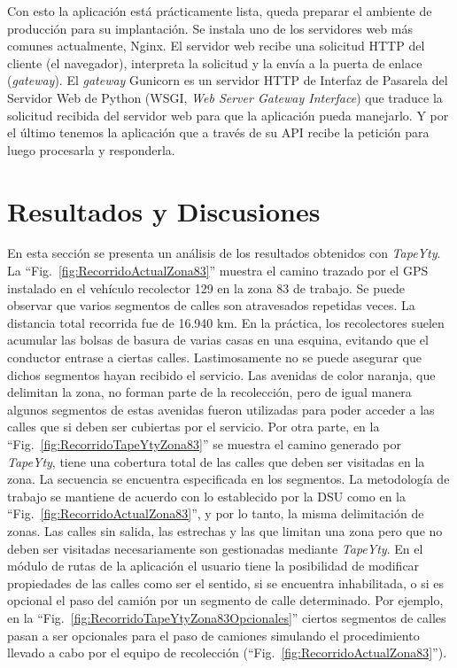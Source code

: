 \documentclass[spanish, conference]{IEEEtran}
\begin{document}
Con esto la aplicación está prácticamente lista, queda preparar el ambiente de producción para su implantación. Se instala uno de los servidores web más comunes actualmente, Nginx. El servidor web recibe una solicitud HTTP del cliente (el navegador), interpreta la solicitud y la envía a la puerta de enlace (\textit{gateway}). El \textit{gateway} Gunicorn es un servidor HTTP de Interfaz de Pasarela del Servidor Web de Python (WSGI, \textit{Web Server Gateway Interface}) que traduce la solicitud recibida del servidor web para que la aplicación pueda manejarlo. Y por el último tenemos la aplicación que a través de su API recibe la petición para luego procesarla y responderla.

\section{Resultados y Discusiones}

En esta sección se presenta un análisis de los resultados obtenidos con \textit{TapeYty}.
La ``Fig.~\ref{fig:RecorridoActualZona83}'' muestra el camino trazado por el GPS instalado en el vehículo recolector 129 en la zona 83 de trabajo. Se puede observar que varios segmentos de calles son atravesados repetidas veces. La distancia total recorrida fue de 16.940 km. En la práctica, los recolectores suelen acumular las bolsas de basura de varias casas en una esquina, evitando que el conductor entrase a ciertas calles. Lastimosamente no se puede asegurar que dichos segmentos hayan recibido el servicio. Las avenidas de color naranja, que delimitan la zona, no forman parte de la recolección, pero de igual manera algunos segmentos de estas avenidas fueron utilizadas para poder acceder a las calles que si deben ser cubiertas por el servicio.
Por otra parte, en la ``Fig.~\ref{fig:RecorridoTapeYtyZona83}'' se muestra el camino generado por \textit{TapeYty}, tiene una cobertura total de las calles que deben ser visitadas en la zona. La secuencia se encuentra especificada en los segmentos. La metodología de trabajo se mantiene de acuerdo con lo establecido por la DSU como en la ``Fig.~\ref{fig:RecorridoActualZona83}'', y por lo tanto, la misma delimitación de zonas.
Las calles sin salida, las estrechas y las que limitan una zona pero que no deben ser visitadas necesariamente son gestionadas mediante \textit{TapeYty}. En el módulo de rutas de la aplicación el usuario tiene la posibilidad de modificar propiedades de las calles como ser el sentido, si se encuentra inhabilitada, o si es opcional el paso del camión por un segmento de calle determinado. Por ejemplo, en la ``Fig.~\ref{fig:RecorridoTapeYtyZona83Opcionales}'' ciertos segmentos de calles pasan a ser opcionales para el paso de camiones simulando el procedimiento llevado a cabo por el equipo de recolección (``Fig.~\ref{fig:RecorridoActualZona83}'').
\end{document}
